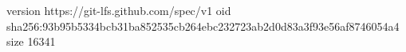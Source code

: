 version https://git-lfs.github.com/spec/v1
oid sha256:93b95b5334bcb31ba852535cb264ebc232723ab2d0d83a3f93e56af8746054a4
size 16341
